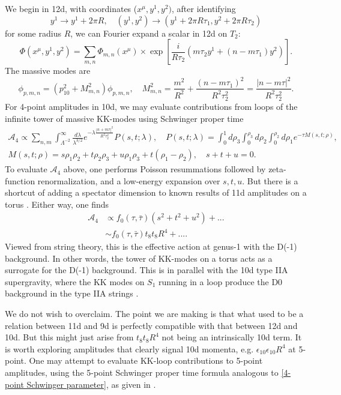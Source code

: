 We begin in 12d, with coordinates ($x^\mu,y^1,y^2)$, after identifying
\begin{equation}
y^1\to y^1+2\pi R,\quad
(y^1,y^2)\to (y^1+2\pi R\tau_1,y^2+2\pi R\tau_2)
\end{equation}
for some radius $R$, we can Fourier expand a scalar in 12d on $T_2$:
\begin{equation}
\Phi(x^\mu,y^1,y^2)
=\sum_{m,n}\Phi_{m,n}(x^\mu) \times\exp
\left[
\frac{i}{R\tau_2}\left(m\tau_2y^1 + (n-m\tau_1)y^2\right)
\right].
\end{equation}
The massive modes are
\begin{equation}
[-\nabla^2_{10}-\nabla^2_2]\phi_{p,m,n}
=\left(p_{10}^2+M_{m,n}^2\right)\phi_{p,m,n},\quad
M^2_{m,n} 
= \frac{m^2}{R^2}+\frac{(n-m\tau_1)^2}{R^2\tau_2^2}
=\frac{|n-m\tau|^2}{R^2\tau_2^2}.
\end{equation}
For 4-point amplitudes in 10d, we may evaluate contributions from loops of the infinite tower of massive KK-modes using Schwinger proper time
\cite{Green:1997as,Beccaria:2023hhi}
\begin{equation}
\begin{aligned}
\mathcal{A}_4
\propto \sum_{n,m}\int_{\Lambda^{-2}}^\infty
\frac{d\lambda}{\lambda^{3/2}}
e^{-\lambda \frac{|n+m\tau|^2}{R^2\tau_2^2}}
P(s,t;\lambda),\quad
P(s,t;\lambda)
=\int_0^1d\rho_3 \int_0^{\rho_3}d\rho_2\int_0^{\rho_2} d\rho_1e^{-\tau M(s,t;\rho)},\\
M(s,t;\rho)=s\rho_1\rho_2+t\rho_2\rho_3+u\rho_1\rho_3 + t(\rho_1-\rho_2),\quad
s+t+u=0.
\end{aligned}
\label{4-point Schwinger parameter}
\end{equation}
To evaluate $\mathcal{A}_4$ above, one performs Poisson resummations followed by zeta-function renormalization, and a low-energy expansion over $s,t,u$.
But there is a shortcut of adding a spectator dimension to known results of 11d amplitudes on a torus \cite{Green:1997as}.
Either way, one finds
\begin{equation}
\begin{aligned}
\mathcal{A}_4
&\propto  f_0(\tau,\bar\tau)(s^2+t^2+u^2)+...\\
&\sim f_0(\tau,\bar\tau)t_8t_8R^4+....
\end{aligned}
\end{equation}
Viewed from string theory, this is the effective action at genus-1 with the D(-1) background.
In other words, the tower of KK-modes on a torus acts as a surrogate for the D(-1) background.
This is in parallel with the 10d type IIA supergravity, where the KK modes on $S_1$ running in a loop produce the D0 background in the type IIA strings \cite{Green:1997as}.

We do not wish to overclaim.
The point we are making is that what used to be a relation between 11d and 9d \cite{Green:1997as} is perfectly compatible with that between 12d and 10d.
But this might just arise from $t_8t_8 R^4$ not being an intrinsically 10d term.
It is worth exploring amplitudes that clearly signal 10d momenta, e.g. $\epsilon_{10}\epsilon_{10}R^4$ at 5-point.
One may attempt to evaluate KK-loop contributions to 5-point amplitudes, using the 5-point Schwinger proper time formula analogous to \eqref{4-point Schwinger parameter}, as given in \cite{Minasian:2015bxa,Green:1999by,Liu:2022bfg}.
